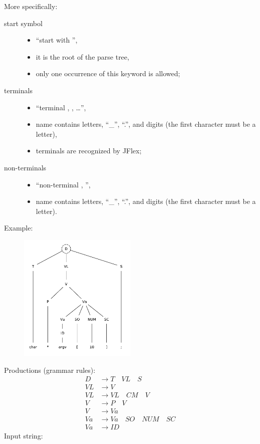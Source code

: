 More specifically:
\begin{description}
    \item[start symbol]
    \begin{itemize}
        \item
        ``start with '',
        \item
        it is the root of the parse tree,
        \item
        only one occurrence of this keyword is allowed;
    \end{itemize}
    \item[terminals]
    \begin{itemize}
        \item
        ``terminal , , \ldots'',
        \item
         name contains letters, ``\_'', ``.'', and digits (the first character must be a letter),
        \item
        terminals are recognized by JFlex;
    \end{itemize}
    \item[non-terminals]
    \begin{itemize}
        \item
        ``non-terminal , '',
        \item
         name contains letters, ``\_'', ``.'', and digits (the first character must be a letter).
    \end{itemize}
\end{description}

Example:
\begin{figure}[H]
    \centerline{\includegraphics[width=0.5\textwidth]{img/18.pdf}}
\end{figure}
Productions (grammar rules):
\begin{align*}
    D &\to T \quad VL \quad S \\
    VL &\to V \\
    VL &\to VL \quad CM \quad V \\
    V &\to P \quad V \\
    V &\to Va \\
    Va &\to Va \quad SO \quad NUM \quad SC \\
    Va &\to ID
\end{align*}
Input string: 

